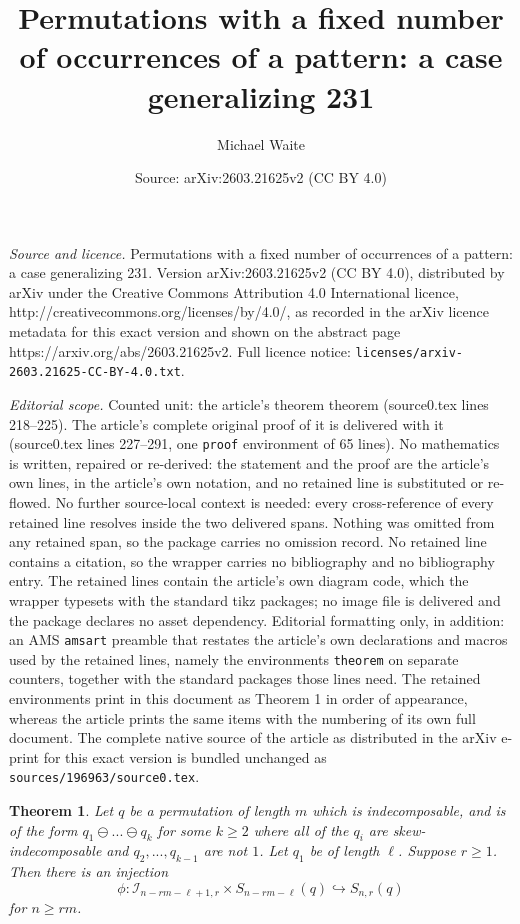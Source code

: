 \documentclass[10pt,a4paper]{amsart}
\title{Permutations with a fixed number of occurrences of a pattern: a case generalizing 231}
\author{Michael Waite}
\date{Source: arXiv:2603.21625v2 (CC BY 4.0)}
\newtheorem{theorem}{Theorem}
\begin{document}
\maketitle

\noindent\emph{Source and licence.} Permutations with a fixed number of occurrences of a pattern: a case generalizing 231. Version arXiv:2603.21625v2 (CC BY 4.0), distributed by arXiv under the Creative Commons Attribution 4.0 International licence, http://creativecommons.org/licenses/by/4.0/, as recorded in the arXiv licence metadata for this exact version and shown on the abstract page https://arxiv.org/abs/2603.21625v2. Full licence notice: \texttt{licenses/arxiv-2603.21625-CC-BY-4.0.txt}.\par\smallskip

\noindent\textit{Editorial scope.} Counted unit: the article's theorem theorem (source0.tex lines 218--225). The article's complete original proof of it is delivered with it (source0.tex lines 227--291, one \texttt{proof} environment of 65 lines). No mathematics is written, repaired or re-derived: the statement and the proof are the article's own lines, in the article's own notation, and no retained line is substituted or re-flowed.  No further source-local context is needed: every cross-reference of every retained line resolves inside the two delivered spans.  Nothing was omitted from any retained span, so the package carries no omission record.  No retained line contains a citation, so the wrapper carries no bibliography and no bibliography entry.  The retained lines contain the article's own diagram code, which the wrapper typesets with the standard tikz packages; no image file is delivered and the package declares no asset dependency.  Editorial formatting only, in addition: an AMS \texttt{amsart} preamble that restates the article's own declarations and macros used by the retained lines, namely the environments \texttt{theorem} on separate counters, together with the standard packages those lines need.  The retained environments print in this document as Theorem 1 in order of appearance, whereas the article prints the same items with the numbering of its own full document.  The complete native source of the article as distributed in the arXiv e-print for this exact version is bundled unchanged as \texttt{sources/196963/source0.tex}.
\begin{theorem}
    Let $q$ be a permutation of length $m$ which is indecomposable, and is of the form $q_1 \ominus ... \ominus q_k$ for some $k \geq 2$ where all of the $q_i$ are skew-indecomposable and $q_2, ..., q_{k-1}$ are not $1$. Let $q_1$ be of length $\ell$.  Suppose $r \geq 1$. Then there is an injection
    \[
    \phi: \mathcal{I}_{n-rm-\ell+1, r} \times S_{n - rm - \ell}(q) \hookrightarrow S_{n,r}(q)
    \]
    for $n\geq rm$.

\end{theorem}
\end{document}
